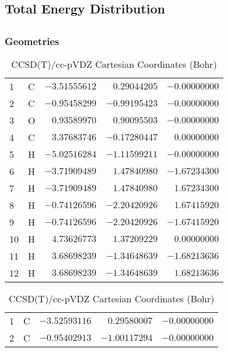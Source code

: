 \documentclass[10pt,oneside]{article}
\begin{document}
\begin{table}
\subsection*{Total Energy Distribution}
\centering\end{table}

\clearpage

\subsection{}

\begin{table}[h!]
\subsubsection*{Geometries}
\begin{multicols}{2}
\centering
\caption{CCSD(T)/cc-pVTZ Cartesian Coordinates (Bohr)}
\begin{tabular}{llrrr}
\toprule
1  & C  & $-3.51555612$ & $ 0.29044205$ & $-0.00000000$ \\
2  & C  & $-0.95458299$ & $-0.99195423$ & $-0.00000000$ \\
3  & O  & $ 0.93589970$ & $ 0.90095503$ & $-0.00000000$ \\
4  & C  & $ 3.37683746$ & $-0.17280447$ & $ 0.00000000$ \\
5  & H  & $-5.02516284$ & $-1.11599211$ & $-0.00000000$ \\
6  & H  & $-3.71909489$ & $ 1.47840980$ & $-1.67234300$ \\
7  & H  & $-3.71909489$ & $ 1.47840980$ & $ 1.67234300$ \\
8  & H  & $-0.74126596$ & $-2.20420926$ & $ 1.67415920$ \\
9  & H  & $-0.74126596$ & $-2.20420926$ & $-1.67415920$ \\
10 & H  & $ 4.73626773$ & $ 1.37209229$ & $ 0.00000000$ \\
11 & H  & $ 3.68698239$ & $-1.34648639$ & $-1.68213636$ \\
12 & H  & $ 3.68698239$ & $-1.34648639$ & $ 1.68213636$ \\
\bottomrule
\end{tabular}
\caption{CCSD(T)/cc-pVDZ Cartesian Coordinates (Bohr)}
\begin{tabular}{llrrr}
\toprule
1  & C  & $-3.52593116$ & $ 0.29580007$ & $-0.00000000$ \\
2  & C  & $-0.95402913$ & $-1.00117294$ & $-0.00000000$ \\

\end{tabular}
\end{multicols}
\end{table}
\end{document}
